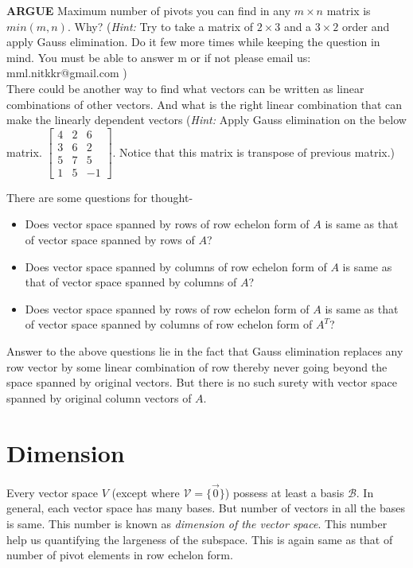 \documentclass{article}
\begin{document}
\begin{itemize}
 
 \textbf{ARGUE} Maximum number of pivots you can find in any $m\times n$ matrix is $min(m,n)$. Why? (\textit{Hint:} Try to take a matrix of $2\times 3$ and a $3\times 2$ order and apply Gauss elimination. Do it few more times while keeping the question in mind. You must be able to answer m or if not please email us: mml.nitkkr@gmail.com )\\
 
 There could be another way to find what vectors can be written as linear combinations of other vectors. And what is the right linear combination that can make the linearly dependent vectors (\textit{Hint:} Apply Gauss elimination on the below matrix. \(\begin{bmatrix}
4 & 2 & 6\\
3 & 6 & 2\\
5 & 7 & 5\\
1 & 5 & -1
\end{bmatrix}\). Notice that this matrix is transpose of previous matrix.)
\end{itemize}
There are some questions for thought-
\begin{itemize}
    \item Does vector space spanned by rows of row echelon form of $A$ is same as that of vector space spanned by rows of $A$?
    \item Does vector space spanned by columns of row echelon form of $A$ is same as that of vector space spanned by columns of $A$?
    \item Does vector space spanned by rows of row echelon form of $A$ is same as that of vector space spanned by columns of row echelon form of $A^T$?
\end{itemize}
Answer to the above questions lie in the fact that Gauss elimination replaces any row vector by some linear combination of row thereby never going beyond the space spanned by original vectors. But there is no such surety with vector space spanned by original column vectors of $A$. 

\section{Dimension}

Every vector space $V$ (except where $\mathcal{V}=\{\vec{0}\}$) possess at least a basis $\mathcal{B}$. In general, each vector space has many bases. But number of vectors in all the bases is same. This number is known as \textit{dimension of the vector space}. This number help us quantifying the largeness of the subspace. This is again same as that of number of pivot elements in row echelon form.\\
\end{document}

